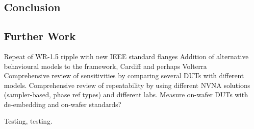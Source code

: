 \documentclass[../thesis/thesis.tex]{subfiles}
\begin{document}
\begin{refsection}
\chapter{Conclusion}
\section{Further Work}
Repeat of WR-1.5 ripple with new IEEE standard flanges
Addition of alternative behavioural models to the framework, Cardiff and perhaps Volterra
Comprehensive review of sensitivities by comparing several DUTs with different models.
Comprehensive review of repeatability by using different NVNA solutions (sampler-based, phase ref types) and different labs.
Measure on-wafer DUTs with de-embedding and on-wafer standards?

Testing, testing\cite{Stant_2016_Coll, Stant_2016}.
\printbibliography[title=References]
\end{refsection}
\end{document}

